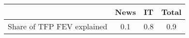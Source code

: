\begin{small}
	\begin{tabular}{lccc}
	\hline
		& News & IT & Total \\
		\hline
		Share of TFP FEV explained & 0.1 & 0.8 & 0.9 \\
		\hline
	\end{tabular}
\end{small}
